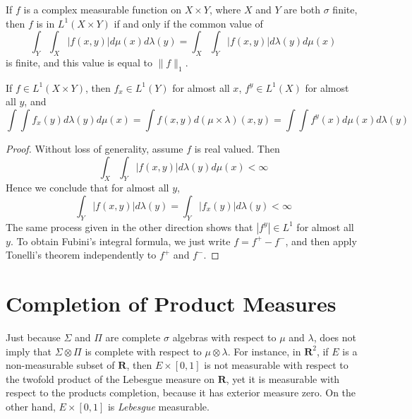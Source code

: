 \begin{corollary}
    If $f$ is a complex measurable function on $X \times Y$, where $X$ and $Y$ are both $\sigma$ finite, then $f$ is in $L^1(X \times Y)$ if and only if the common value of
    \[ \int_Y \int_X |f(x,y)| d\mu(x) d\lambda(y) = \int_X \int_Y |f(x,y)| d\lambda(y) d\mu(x) \]
    is finite, and this value is equal to $\| f \|_1$.
\end{corollary}

\begin{theorem}[Fubini]
    If $f \in L^1(X \times Y)$, then $f_x \in L^1(Y)$ for almost all $x$, $f^y \in L^1(X)$ for almost all $y$, and
    \[ \int \int f_x(y) d\lambda(y) d\mu(x) = \int f(x,y) d(\mu \times \lambda)(x,y) = \int \int f^y(x) d\mu(x) d\lambda(y) \]
\end{theorem}
\begin{proof}
    Without loss of generality, assume $f$ is real valued. Then
    \[ \int_X \int_Y |f(x,y)| d\lambda(y) d\mu(x) < \infty \]
    Hence we conclude that for almost all $y$,
    \[ \int_Y |f(x,y)| d\lambda(y) = \int_Y |f_x(y)| d\lambda(y) < \infty \]
    The same process given in the other direction shows that $|f^y| \in L^1$ for almost all $y$. To obtain Fubini's integral formula, we just write $f = f^+ - f^-$, and then apply Tonelli's theorem independently to $f^+$ and $f^-$.
\end{proof}

\section{Completion of Product Measures}

Just because $\Sigma$ and $\Pi$ are complete $\sigma$ algebras with respect to $\mu$ and $\lambda$, does not imply that $\Sigma \otimes \Pi$ is complete with respect to $\mu \otimes \lambda$. For instance, in $\mathbf{R}^2$, if $E$ is a non-measurable subset of $\mathbf{R}$, then $E \times [0,1]$ is not measurable with respect to the twofold product of the Lebesgue measure on $\mathbf{R}$, yet it is measurable with respect to the products completion, because it has exterior measure zero. On the other hand, $E \times [0,1]$ is {\it Lebesgue} measurable.

